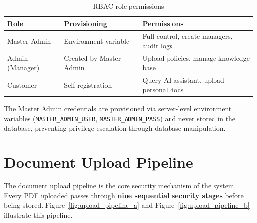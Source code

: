 \begin{table}[H]
\centering
\caption{RBAC role permissions}
\label{tab:rbac}
\begin{tabular}{lll}
\toprule
\textbf{Role} & \textbf{Provisioning} & \textbf{Permissions} \\
\midrule
Master Admin & Environment variable & Full control, create managers, audit logs \\
Admin (Manager) & Created by Master Admin & Upload policies, manage knowledge base \\
Customer & Self-registration & Query AI assistant, upload personal docs \\
\bottomrule
\end{tabular}
\end{table}

The Master Admin credentials are provisioned via server-level environment variables (\texttt{MASTER\_ADMIN\_USER}, \texttt{MASTER\_ADMIN\_PASS}) and never stored in the database, preventing privilege escalation through database manipulation.

\section{Document Upload Pipeline}

The document upload pipeline is the core security mechanism of the system. Every PDF uploaded passes through \textbf{nine sequential security stages} before being stored. Figure~\ref{fig:upload_pipeline_a} and Figure~\ref{fig:upload_pipeline_b} illustrate this pipeline.

